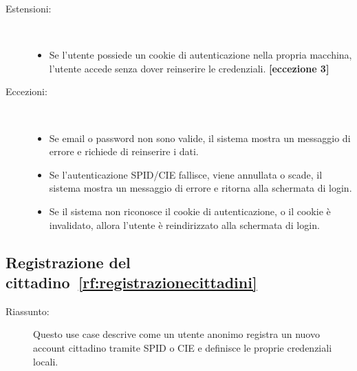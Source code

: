 \begin{ucscope}
\begin{description}
	\item[Estensioni:]~
	\begin{itemize}
		\item[(0)] Se l'utente possiede un cookie di autenticazione nella propria macchina, l'utente accede senza dover reinserire le credenziali.  \textbf{[eccezione 3]}
	\end{itemize}

	\item[Eccezioni:]~
	\begin{itemize}
		\item[(1)] Se email o password non sono valide, il sistema mostra un messaggio di errore e richiede di reinserire i dati.
		\item[(2)] Se l’autenticazione SPID/CIE fallisce, viene annullata o scade, il sistema mostra un messaggio di errore e ritorna alla schermata di login.
		\item[(3)] Se il sistema non riconosce il cookie di autenticazione, o il cookie è invalidato, allora l'utente è reindirizzato alla schermata di login.
	\end{itemize}
\end{description}

\subsection{Registrazione del cittadino~\ref{rf:registrazionecittadini}}

\begin{description}
	\item[Riassunto:]
	Questo use case descrive come un utente anonimo registra un nuovo account cittadino tramite SPID o CIE e definisce le proprie credenziali locali.


\end{description}
\end{ucscope}
